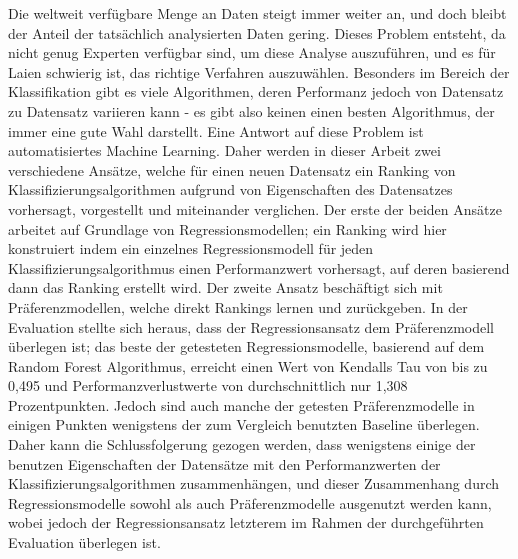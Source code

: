 Die weltweit verfügbare Menge an Daten steigt immer weiter an, und doch bleibt der Anteil der tatsächlich analysierten Daten gering. Dieses Problem entsteht, da nicht genug Experten verfügbar sind, um diese Analyse auszuführen, und es für Laien schwierig ist, das richtige Verfahren auszuwählen. Besonders im Bereich der Klassifikation gibt es viele Algorithmen, deren Performanz jedoch von Datensatz zu Datensatz variieren kann - es gibt also keinen einen besten Algorithmus, der immer eine gute Wahl darstellt. Eine Antwort auf diese Problem ist automatisiertes Machine Learning. Daher werden in dieser Arbeit zwei verschiedene Ansätze, welche für einen neuen Datensatz ein Ranking von Klassifizierungsalgorithmen aufgrund von Eigenschaften des Datensatzes vorhersagt, vorgestellt und miteinander verglichen. Der erste der beiden Ansätze arbeitet auf Grundlage von Regressionsmodellen; ein Ranking wird hier konstruiert indem ein einzelnes Regressionsmodell für jeden Klassifizierungsalgorithmus einen Performanzwert vorhersagt, auf deren basierend dann das Ranking erstellt wird. Der zweite Ansatz beschäftigt sich mit Präferenzmodellen, welche direkt Rankings lernen und zurückgeben. In der Evaluation stellte sich heraus, dass der Regressionsansatz dem Präferenzmodell überlegen ist; das beste der getesteten Regressionsmodelle, basierend auf dem Random Forest Algorithmus, erreicht einen Wert von Kendalls Tau von bis zu 0,495 und Performanzverlustwerte von durchschnittlich nur 1,308 Prozentpunkten. Jedoch sind auch manche der getesten Präferenzmodelle in einigen Punkten wenigstens der zum Vergleich benutzten Baseline überlegen. Daher kann die Schlussfolgerung gezogen werden, dass wenigstens einige der benutzen Eigenschaften der Datensätze mit den Performanzwerten der Klassifizierungsalgorithmen zusammenhängen, und dieser Zusammenhang durch Regressionsmodelle sowohl als auch Präferenzmodelle ausgenutzt werden kann, wobei jedoch der Regressionsansatz letzterem im Rahmen der durchgeführten Evaluation überlegen ist.
